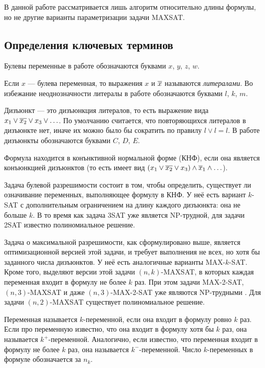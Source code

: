 В данной работе рассматривается лишь алгоритм относительно длины формулы, но не другие варианты параметризации задачи MAXSAT.

\subsection*{Определения ключевых терминов}

Булевы переменные в работе обозначаются буквами $x$, $y$, $z$, $w$.

Если $x$ — булева переменная, то выражения $x$ и $\overline{x}$ называются \textit{литералами}. Во избежание неоднозначности литералы в работе обозначаются буквами $l$, $k$, $m$.

Дизъюнкт — это дизъюнкция литералов, то есть выражение вида $x_1 \vee \overline{x_2} \vee x_3 \vee \ldots$. По умолчанию считается, что повторяющихся литералов в дизъюнкте нет, иначе их можно было бы сократить по правилу $l \vee l = l$. В работе дизъюнкты обозначаются буквами $C$, $D$, $E$.

Формула находится в конънктивной нормальной форме (КНФ), если она является конъюнкцией дизъюнктов (то есть имеет вид $(x_1 \vee \overline{x_2} \vee x_3) \wedge \overline{x}_1 \wedge \ldots$).

Задача булевой разрешимости состоит в том, чтобы определить, существует ли означивание переменных, выполняющее формулу в КНФ. У неё есть вариант $k$-SAT с дополнительным ограничением на длину каждого дизъюнкта: она не больше $k$. В то время как задача 3SAT уже является NP-трудной, для задачи 2SAT известно полиномиальное решение.

Задача о максимальной разрешимости, как сформулировано выше, является оптимизационной версией этой задачи, и требует выполнения не всех, но хотя бы заданного числа дизъюнктов. У неё есть аналогичные варианты MAX-$k$-SAT. Кроме того, выделяют версии этой задачи $(n,k)$-MAXSAT, в которых каждая переменная входит в формулу не более $k$ раз. При этом задачи MAX-2-SAT, $(n,3)$-MAXSAT и даже $(n,3)$-MAX-2-SAT уже являются NP-трудными \cite{raman1998simplified}. Для задачи $(n,2)$-MAXSAT существует полиномиальное решение.

Переменная называется $k$-переменной, если она входит в формулу ровно $k$ раз.
Если про переменную известно, что она входит в формулу хотя бы $k$ раз, она называется $k^+$-переменной. Аналогично, если известно, что переменная входит в формулу не более $k$ раз, она называется $k^-$-переменной. Число $k$-переменных в формуле обозначается за $n_k$.

